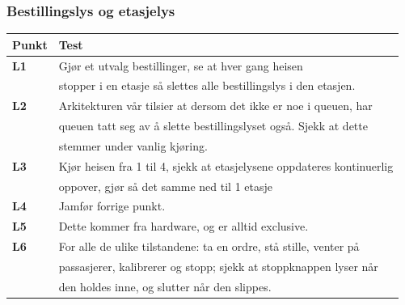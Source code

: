 \documentclass{article}
\begin{document}
\subsubsection{Bestillingslys og etasjelys}
\begin{table}[htpb]
\begin{tabularx}{\textwidth}{ l l }  %
\toprule
Punkt & Test \\
        \midrule
        \textbf{L1} & Gjør et utvalg bestillinger, se at hver gang heisen\\
        & stopper i en etasje så slettes alle bestillingslys i den etasjen. \\
        \midrule
        \textbf{L2} & Arkitekturen vår tilsier at dersom det ikke er noe i queuen, har \\
        & queuen tatt seg av å slette bestillingslyset også. Sjekk at dette \\
        & stemmer under vanlig kjøring. \\
        \midrule
        \textbf{L3} & Kjør heisen fra 1 til 4, sjekk at etasjelysene oppdateres kontinuerlig \\
        & oppover, gjør så det samme ned til 1 etasje\\
        \midrule
        \textbf{L4} & Jamfør forrige punkt. \\
        \midrule
        \textbf{L5} & Dette kommer fra hardware, og er alltid exclusive. \\
        \midrule
        \textbf{L6} & For alle de ulike tilstandene: ta en ordre, stå stille, venter på  \\
        & passasjerer, kalibrerer og stopp; sjekk at stoppknappen lyser når  \\
        & den holdes inne, og slutter når den slippes. \\
\bottomrule
\end{tabularx}
\label{table:nonlin}
\end{table}
\end{document}
